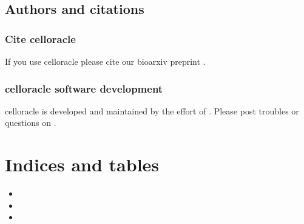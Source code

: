 \documentclass[letterpaper,10pt,english]{sphinxmanual}
\begin{document}
%
\begin{sphinxVerbatim}[commandchars=\\\{\}]
 

        


         
\end{sphinxVerbatim}


\section{Authors and citations}
\label{\detokenize{citation/index:authors-and-citations}}\label{\detokenize{citation/index:citing}}\label{\detokenize{citation/index::doc}}

\subsection{Cite celloracle}
\label{\detokenize{citation/index:cite-celloracle}}
If you use celloracle please cite our bioarxiv preprint .


\subsection{celloracle software development}
\label{\detokenize{citation/index:celloracle-software-development}}
celloracle is developed and maintained by the effort of  .
Please post troubles or questions on  .


\chapter{Indices and tables}
\label{\detokenize{index:indices-and-tables}}\begin{itemize}
\item {} 

\item {} 

\item {} 

\end{itemize}
\end{document}
